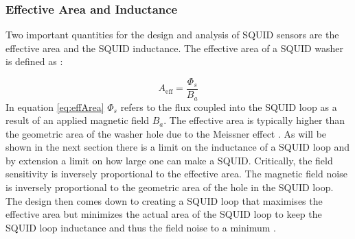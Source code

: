 \subsubsection*{Effective Area and Inductance}
Two important quantities for the design and analysis of SQUID sensors are the effective area and the SQUID inductance. The effective area of a SQUID washer is defined as \cite{SQUIDhandbook}:

\begin{equation}
    A_{\text{eff}} = \frac{\Phi_s}{B_a}
    \label{eq:effArea}
\end{equation}
In equation \ref{eq:effArea} $\Phi_s$ refers to the flux coupled into the SQUID loop as a result of an applied magnetic field $B_a$. The effective area is typically higher than the geometric area of the washer hole due to the Meissner effect \cite{Drung2016NBSQUIDS}. As will be shown in the next section there is a limit on the inductance of a SQUID loop and by extension a limit on how large one can make a SQUID. Critically, the field sensitivity is inversely proportional to the effective area. The magnetic field noise is inversely proportional to the geometric area of the hole in the SQUID loop. The design then comes down to creating a SQUID loop that maximises the effective area but minimizes the actual area of the SQUID loop to keep the SQUID loop inductance and thus the field noise to a minimum \cite{SQUIDhandbook}.


